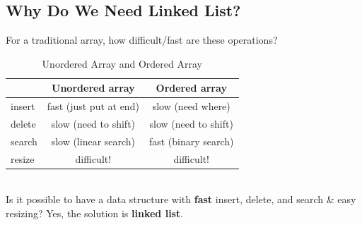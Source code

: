 \documentclass[letterpaper,12pt]{article}
\begin{document}
\subsection{Why Do We Need Linked List?}
For a traditional array, how difficult/fast are these operations?
\begin{table}[h]
    \centering
    \begin{tabular}{|l|c|c|} \hline 
          &Unordered array& Ordered array\\ \hline 
          insert&fast (just put at end)& slow (need where)\\ \hline 
          delete&slow (need to shift)& slow (need to shift)\\ \hline 
          search&slow (linear search)& fast (binary search)\\ \hline 
          resize&difficult!& difficult!\\ \hline
    \end{tabular}
    \caption{Unordered Array and Ordered Array}
    \label{tab:unordered-vs-ordered-array}
\end{table}
\\
Is it possible to have a data structure with \textbf{fast} insert, delete, and search \& easy resizing? Yes, the solution is \textbf{linked list}.
\end{document}
